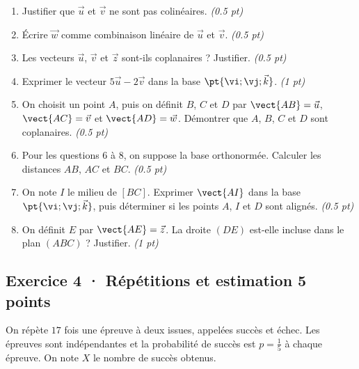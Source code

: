 \begin{enumerate}

\item Justifier que $\vec u$ et $\vec v$ ne sont pas colinéaires. \hfill\textit{(\num{0,5} pt)}

\item Écrire $\vec w$ comme combinaison linéaire de $\vec u$ et $\vec v$. \hfill\textit{(\num{0,5} pt)}

\item Les vecteurs $\vec u$, $\vec v$ et $\vec z$ sont-ils coplanaires ? Justifier. \hfill\textit{(\num{0,5} pt)}

\item Exprimer le vecteur $5\vec u-2\vec v$ dans la base $\pt{\vi;\vj;\vec k}$. \hfill\textit{(1 pt)}

\item On choisit un point $A$, puis on définit $B$, $C$ et $D$ par $\vect{AB}=\vec u$, $\vect{AC}=\vec v$ et $\vect{AD}=\vec w$. Démontrer que $A$, $B$, $C$ et $D$ sont coplanaires. \hfill\textit{(\num{0,5} pt)}

\item Pour les questions 6 à 8, on suppose la base orthonormée. Calculer les distances $AB$, $AC$ et $BC$. \hfill\textit{(\num{0,5} pt)}

\item On note $I$ le milieu de $[BC]$. Exprimer $\vect{AI}$ dans la base $\pt{\vi;\vj;\vec k}$, puis déterminer si les points $A$, $I$ et $D$ sont alignés. \hfill\textit{(\num{0,5} pt)}

\item On définit $E$ par $\vect{AE}=\vec z$. La droite $(DE)$ est-elle incluse dans le plan $(ABC)$ ? Justifier. \hfill\textit{(1 pt)}

\end{enumerate}

\subsection*{Exercice 4 · Répétitions et estimation \hfill 5 points}On répète $17$ fois une épreuve à deux issues, appelées succès et échec. Les épreuves sont indépendantes et la probabilité de succès est $p=\frac{1}{5}$ à chaque épreuve. On note $X$ le nombre de succès obtenus.

